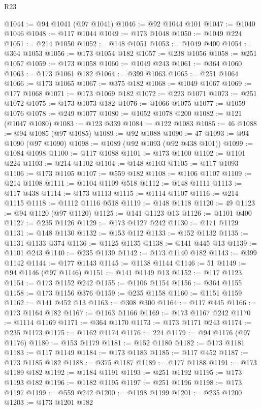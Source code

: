 \begin{lexlean}{R23}
\begin{coremodule}
@1044 := @94 @1041 (@97 @1041)
@1046 := @92 @1044 @101
@1047 := @1040 @1046
@1048 := @117 @1044
@1049 := @173 @1048
@1050 := @1049 @224
@1051 := @214 @1050
@1052 := @148 @1051
@1053 := @1049 @400
@1054 := @364 @1053
@1056 := @173 @1054 @182
@1057 := @238 @1056
@1058 := @251 @1057
@1059 := @173 @1058
@1060 := @1049 @243
@1061 := @364 @1060
@1063 := @173 @1061 @182
@1064 := @399 @1063
@1065 := @251 @1064
@1066 := @173 @1065
@1067 := @375 @182
@1068 := @1049 @1067
@1069 := @177 @1068
@1071 := @173 @1069 @182
@1072 := @223 @1071
@1073 := @251 @1072
@1075 := @173 @1073 @182
@1076 := @1066 @1075
@1077 := @1059 @1076
@1078 := @249 @1077
@1080 := @1052 @1078 @200
@1082 := @121 (@1047 @1080)
@1083 := @123 @339
@1084 := @122 @1083
@1085 := 46
@1088 := @94 @1085 (@97 @1085)
@1089 := @92 @1088
@1090 := 47
@1093 := @94 @1090 (@97 @1090)
@1098 := @1089 (@92 @1093 (@92 @438 @101))
@1099 := @1084 @1098
@1100 := @117 @1088
@1101 := @173 @1100
@1102 := @1101 @224
@1103 := @214 @1102
@1104 := @148 @1103
@1105 := @117 @1093
@1106 := @173 @1105
@1107 := @559 @182
@1108 := @1106 @1107
@1109 := @214 @1108
@1111 := @1104 @1109 @518
@1112 := @148 @1111
@1113 := @117 @438
@1114 := @173 @1113
@1115 := @1114 @1107
@1116 := @214 @1115
@1118 := @1112 @1116 @518
@1119 := @148 @1118
@1120 := 49
@1123 := @94 @1120 (@97 @1120)
@1125 := @141 @1123 @13
@1126 := @1101 @400
@1127 := @235 @1126
@1129 := @173 @1127 @242
@1130 := @171 @1129
@1131 := @148 @1130
@1132 := @153 @112
@1133 := @152 @1132
@1135 := @1131 @1133 @374
@1136 := @1125 @1135
@1138 := @141 @445 @13
@1139 := @1101 @243
@1140 := @235 @1139
@1142 := @173 @1140 @182
@1143 := @399 @1142
@1144 := @177 @1143
@1145 := @1138 @1144
@1146 := 51
@1149 := @94 @1146 (@97 @1146)
@1151 := @141 @1149 @13
@1152 := @117 @1123
@1154 := @173 @1152 @242
@1155 := @1106 @1154
@1156 := @364 @1155
@1158 := @173 @1156 @376
@1159 := @235 @1158
@1160 := @1151 @1159
@1162 := @141 @452 @13
@1163 := @308 @300
@1164 := @117 @445
@1166 := @173 @1164 @182
@1167 := @1163 @1166
@1169 := @173 @1167 @242
@1170 := @1114 @1169
@1171 := @364 @1170
@1173 := @173 @1171 @243
@1174 := @235 @1173
@1175 := @1162 @1174
@1176 := 224
@1179 := @94 @1176 (@97 @1176)
@1180 := @153 @1179
@1181 := @152 @1180
@1182 := @173 @1181
@1183 := @117 @1149
@1184 := @173 @1183
@1185 := @117 @452
@1187 := @173 @1185 @182
@1188 := @375 @1187
@1189 := @177 @1188
@1191 := @173 @1189 @182
@1192 := @1184 @1191
@1193 := @251 @1192
@1195 := @173 @1193 @182
@1196 := @1182 @1195
@1197 := @251 @1196
@1198 := @173 @1197
@1199 := @559 @242
@1200 := @1198 @1199
@1201 := @235 @1200
@1203 := @173 @1201 @182

\end{coremodule}
\end{lexlean}
